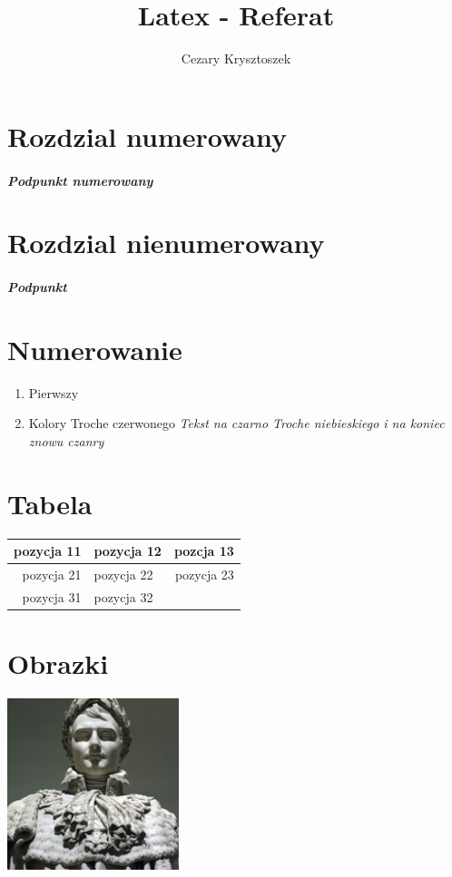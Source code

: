 \documentclass[a4paper]{article}
\title{Latex - Referat}
\author{Cezary Krysztoszek}
\begin{document}
\maketitle 

\section{Rozdzial numerowany}
\subparagraph{Podpunkt numerowany}

\section*{Rozdzial nienumerowany}
\subparagraph*{Podpunkt}
\section {Numerowanie}
\begin{enumerate}
\item Pierwszy
\item Kolory \newline
{\color{red} Troche czerwonego} \newline %
\emph{Tekst na czarno {\color{blue} Troche niebieskiego} i na koniec znowu czanry}
\end{enumerate}
\section{Tabela}
\begin{tabular}{|r|l r|}  %
  \hline 
  pozycja 11 & pozycja 12 & pozcja 13\\
  \hline
  pozycja 21 & pozycja 22 & pozycja 23 \\
  \hline %
  pozycja 31 & pozycja 32 
  
\end{tabular} 
\section{Obrazki}
\includegraphics[width=5cm, height=5cm]{obrazek1}
\newpage %
\end{document}
